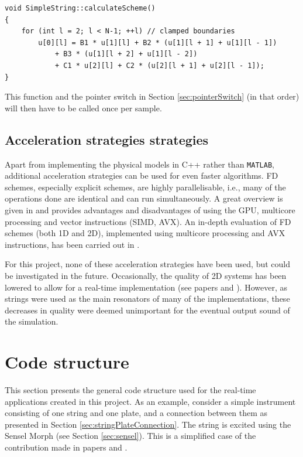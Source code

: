 \begin{lstlisting}[belowskip=-0.5\baselineskip]
void SimpleString::calculateScheme()
{
    for (int l = 2; l < N-1; ++l) // clamped boundaries
        u[0][l] = B1 * u[1][l] + B2 * (u[1][l + 1] + u[1][l - 1]) 
            + B3 * (u[1][l + 2] + u[1][l - 2])         
            + C1 * u[2][l] + C2 * (u[2][l + 1] + u[2][l - 1]);
}
\end{lstlisting}
This function and the pointer switch in Section \ref{sec:pointerSwitch} (in that order) will then have to be called once per sample.

\subsection{Acceleration strategies strategies}
Apart from implementing the physical models in C++ rather than \texttt{MATLAB}, additional acceleration strategies can be used for even faster algorithms. FD schemes, especially explicit schemes, are highly parallelisable, i.e., many of the operations done are identical and can run simultaneously. A great overview is given in \cite{Bilbao2019CMJb} and provides advantages and disadvantages of using the GPU, multicore processing and vector instructions (SIMD, AVX). An in-depth evaluation of FD schemes (both 1D and 2D), implemented using multicore processing and AVX instructions, has been carried out in \cite{Webb2015}.

For this project, none of these acceleration strategies have been used, but could be investigated in the future. Occasionally, the quality of 2D systems has been lowered to allow for a real-time implementation (see papers \citeP[A] and \citeP[D]). However, as strings were used as the main resonators of many of the implementations, these decreases in quality were deemed unimportant for the eventual output sound of the simulation.

\section{Code structure}\label{sec:codeStructure}
This section presents the general code structure used for the real-time applications created in this project. As an example, consider a simple instrument consisting of one string and one plate, and a connection between them as presented in Section \ref{sec:stringPlateConnection}. The string is excited using the Sensel Morph (see Section \ref{sec:sensel}). This is a simplified case of the contribution made in papers \citeP[A] and \citeP[B]. 

